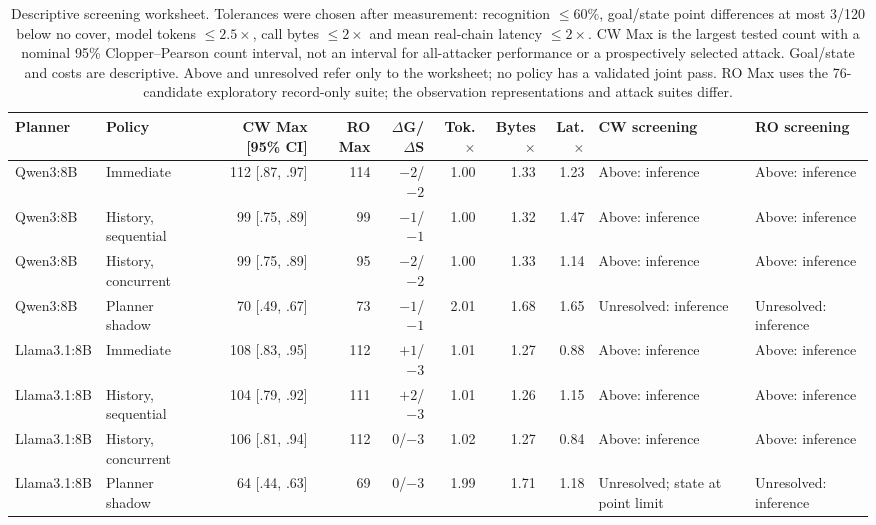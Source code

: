 \begin{table}[t]\centering\footnotesize
\caption{Descriptive screening worksheet. Tolerances were chosen after measurement: recognition $\le60\%$, goal/state point differences at most 3/120 below no cover, model tokens $\le2.5\times$, call bytes $\le2\times$ and mean real-chain latency $\le2\times$. CW Max is the largest tested count with a nominal 95\% Clopper--Pearson count interval, not an interval for all-attacker performance or a prospectively selected attack. Goal/state and costs are descriptive. Above and unresolved refer only to the worksheet; no policy has a validated joint pass. RO Max uses the 76-candidate exploratory record-only suite; the observation representations and attack suites differ.}\label{tab:decision}
\setlength{\tabcolsep}{3pt}
\begin{tabularx}{\textwidth}{@{}llrrrrrrYY@{}}\toprule
Planner & Policy & CW Max [95\% CI] & RO Max & $\Delta$G/$\Delta$S & Tok.$\times$ & Bytes$\times$ & Lat.$\times$ & CW screening & RO screening \\\midrule
Qwen3:8B & Immediate & 112 [.87, .97] & 114 & $-2$/$-2$ & 1.00 & 1.33 & 1.23 & Above: inference & Above: inference \\
Qwen3:8B & History, sequential & 99 [.75, .89] & 99 & $-1$/$-1$ & 1.00 & 1.32 & 1.47 & Above: inference & Above: inference \\
Qwen3:8B & History, concurrent & 99 [.75, .89] & 95 & $-2$/$-2$ & 1.00 & 1.33 & 1.14 & Above: inference & Above: inference \\
Qwen3:8B & Planner shadow & 70 [.49, .67] & 73 & $-1$/$-1$ & 2.01 & 1.68 & 1.65 & Unresolved: inference & Unresolved: inference \\\midrule
Llama3.1:8B & Immediate & 108 [.83, .95] & 112 & $+1$/$-3$ & 1.01 & 1.27 & 0.88 & Above: inference & Above: inference \\
Llama3.1:8B & History, sequential & 104 [.79, .92] & 111 & $+2$/$-3$ & 1.01 & 1.26 & 1.15 & Above: inference & Above: inference \\
Llama3.1:8B & History, concurrent & 106 [.81, .94] & 112 & $0$/$-3$ & 1.02 & 1.27 & 0.84 & Above: inference & Above: inference \\
Llama3.1:8B & Planner shadow & 64 [.44, .63] & 69 & $0$/$-3$ & 1.99 & 1.71 & 1.18 & Unresolved; state at point limit & Unresolved: inference \\\bottomrule
\end{tabularx}\end{table}
